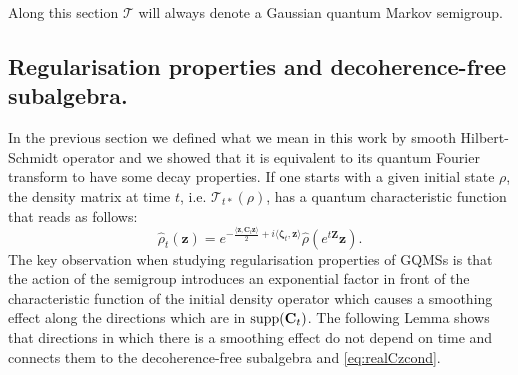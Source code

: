 \documentclass[preprint]{elsarticle}
\theoremstyle{definition}
\def\TT{\mathcal{T}}
\begin{document}
Along this section $\TT$ will always denote a Gaussian quantum Markov semigroup.


\subsection{Regularisation properties and decoherence-free subalgebra.}

In the previous section we defined what we mean in this work by smooth Hilbert-Schmidt operator and we showed that it is equivalent to its quantum Fourier transform to have some decay properties. If one starts with a given initial state $\rho$, the density matrix at time $t$, i.e. $\TT_{t*}(\rho)$, has a quantum characteristic function that reads as follows:
\begin{equation} \label{eq:evolution}\widehat{\rho}_t(\mathbf{z})=e^{-\frac{\langle \mathbf{z},\mathbf{C}_t\mathbf{z}\rangle}{2}+i\langle\boldsymbol{\zeta}_t, \mathbf{z}\rangle}\widehat{\rho}(e^{t\mathbf{Z}}\mathbf{z}).\end{equation}
The key observation when studying regularisation properties of GQMSs is that the action of the semigroup introduces an exponential factor in front of the characteristic function of the initial density operator which causes a smoothing effect along the directions which are in ${\rm supp}(\mathbf{C}_t)$. The following Lemma shows that directions in which there is a smoothing effect do not depend on time and connects them to the decoherence-free subalgebra and \ref{eq:realCzcond}.
\end{document}
